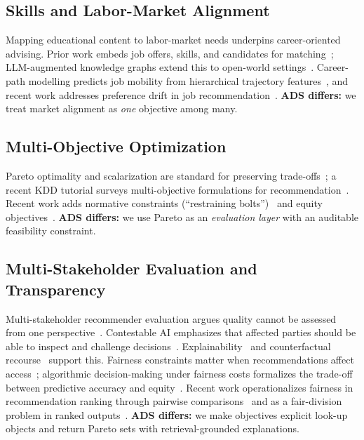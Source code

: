 \documentclass[sigconf,review]{acmart}
\begin{document}
\subsection{Skills and Labor-Market Alignment}
Mapping educational content to labor-market needs underpins career-oriented advising. Prior work embeds job offers, skills, and candidates for matching~\cite{giabelli2021skills2job,kara2022skillEmbeddings,leon2024transversalSkills,shi2020job2skills}; LLM-augmented knowledge graphs extend this to open-world settings~\cite{zhang2024recsysbench}. Career-path modelling predicts job mobility from hierarchical trajectory features~\cite{meng2019career}, and recent work addresses preference drift in job recommendation~\cite{han2024bistro}. \textbf{ADS differs:} we treat market alignment as \emph{one} objective among many.

\subsection{Multi-Objective Optimization}
Pareto optimality and scalarization are standard for preserving trade-offs~\cite{roijers2013survey_mosdm,deb2002nsga2}; a recent KDD tutorial surveys multi-objective formulations for recommendation~\cite{zheng2021multiobjective}. Recent work adds normative constraints (``restraining bolts'')~\cite{monb2025,restrainingBolts2025} and equity objectives~\cite{equityMAMORL2025}. \textbf{ADS differs:} we use Pareto as an \emph{evaluation layer} with an auditable feasibility constraint.

\subsection{Multi-Stakeholder Evaluation and Transparency}
Multi-stakeholder recommender evaluation argues quality cannot be assessed from one perspective~\cite{abdollahpouri2020multistakeholder,burke2025mseval,ge2024trustworthyRS}.
Contestable AI emphasizes that affected parties should be able to inspect and challenge decisions~\cite{aler2020contestable,alfrink2023contestable,dignum2025contesting}.
Explainability~\cite{zhang2020explainableRS} and counterfactual recourse~\cite{wachter2017counterfactual,ustun2019recourse,robustx2025} support this.
Fairness constraints matter when recommendations affect access~\cite{ekstrand2019fairness,dwork2012fairness,hardt2016equality,fairRankAgg2025,fairdas2024}; algorithmic decision-making under fairness costs formalizes the trade-off between predictive accuracy and equity~\cite{corbettdavies2017cost}. Recent work operationalizes fairness in recommendation ranking through pairwise comparisons~\cite{beutel2019fairness} and as a fair-division problem in ranked outputs~\cite{saito2022fair}.
\textbf{ADS differs:} we make objectives explicit look-up objects and return Pareto sets with retrieval-grounded explanations.
\end{document}
